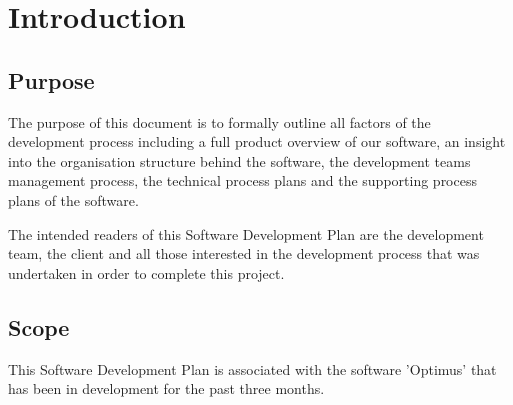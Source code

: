 
\chapter{Introduction} %

\label{Part6Chapter1} %



\section{Purpose}

The purpose of this document is to formally outline all factors of the development process including a full product overview of our software, an insight into the organisation structure behind the software, the development teams management process, the technical process plans and the supporting process plans of the software.

The intended readers of this Software Development Plan are the development team, the client and all those interested in the development process that was undertaken in order to complete this project.


\section{Scope}

This Software Development Plan is associated with the software 'Optimus' that has been in development for the past three months. 



